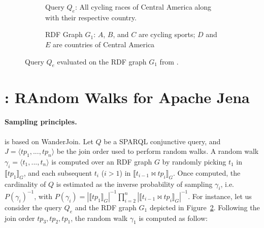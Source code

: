 
\begin{figure}
  \setlength{\fboxsep}{0pt} %
  \begin{subfigure}{0.48\textwidth}
    \caption{\label{fig:q1-j2-1hop}Query $Q_e$: All cycling races of Central America along
      with their respective country.}
  \end{subfigure}
  \hfill
  \begin{subfigure}{0.48\textwidth}
    \fbox{%
      \resizebox{\textwidth}{!}{%
        
    }}
    \caption{RDF Graph $G_1$: $A$, $B$, and $C$ are cycling sports; $D$ and $E$
      are countries of Central America~\cite{10.1007/978-3-031-33455-9_3}}
  \end{subfigure}
  \caption{\label{fig:random_walks_example} Query $Q_e$  evaluated on the RDF graph $G_1$ from \cite{10.1007/978-3-031-33455-9_3}.
    }
\end{figure}

\section{\NAME: RAndom Walks for Apache Jena}

\paragraph{Sampling principles.}

\NAME is based on WanderJoin\cite{li2019wanderjoin}.
Let $Q$ be a SPARQL conjunctive query, and $J = \langle tp_1, ..., tp_n \rangle$ be
the join order used to perform random walks. A random walk
$\gamma_i = \langle t_1, ..., t_n\rangle$ is computed over
an RDF graph $G$ by randomly picking $t_1$ in $\llbracket tp_1 \rrbracket_G$,
and each subsequent $t_i$ ($i > 1$) in $\llbracket t_{i-1} \bowtie tp_i \rrbracket_G$.
Once computed, the cardinality of $Q$ is estimated as the inverse probability
of sampling $\gamma_i$, i.e. $P(\gamma_i)^{-1}$, with $P(\gamma_i) = |\llbracket tp_1 \rrbracket_G|^{-1} \prod_{i=2}^{n}
|\llbracket t_{i-1} \bowtie tp_i \rrbracket_G|^{-1}$.
%
For instance, let us consider the query $Q_e$ and the RDF graph $G_1$
depicted in Figure~\ref{fig:random_walks_example}. Following the join order $tp_3,tp_2,tp_1$, the random walk 
$\gamma_1$ is computed as follow:

